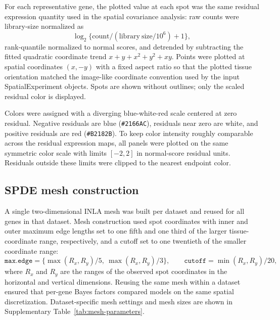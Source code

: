 For each representative gene, the plotted value at each spot was the same residual expression quantity used in the spatial covariance analysis: raw counts were library-size normalized as
\[
\log_2\{ \mathrm{count}/(\mathrm{library\ size}/10^6) + 1\},
\]
rank-quantile normalized to normal scores, and detrended by subtracting the fitted quadratic coordinate trend \(x + y + x^2 + y^2 + xy\). Points were plotted at spatial coordinates \((x,-y)\) with a fixed aspect ratio so that the plotted tissue orientation matched the image-like coordinate convention used by the input SpatialExperiment objects. Spots are shown without outlines; only the scaled residual color is displayed.

Colors were assigned with a diverging blue-white-red scale centered at zero residual. Negative residuals are blue (\texttt{\#2166AC}), residuals near zero are white, and positive residuals are red (\texttt{\#B2182B}). To keep color intensity roughly comparable across the residual expression maps, all panels were plotted on the same symmetric color scale with limits \([-2,2]\) in normal-score residual units. Residuals outside these limits were clipped to the nearest endpoint color.

\subsection{SPDE mesh construction}
A single two-dimensional INLA mesh was built per dataset and reused for all genes in that dataset. Mesh construction used spot coordinates with inner and outer maximum edge lengths set to one fifth and one third of the larger tissue-coordinate range, respectively, and a cutoff set to one twentieth of the smaller coordinate range:
\[
\texttt{max.edge} = \{\max(R_x,R_y)/5,\ \max(R_x,R_y)/3\}, \qquad
\texttt{cutoff} = \min(R_x,R_y)/20,
\]
where \(R_x\) and \(R_y\) are the ranges of the observed spot coordinates in the horizontal and vertical dimensions. Reusing the same mesh within a dataset ensured that per-gene Bayes factors compared models on the same spatial discretization. Dataset-specific mesh settings and mesh sizes are shown in Supplementary Table~\ref{tab:mesh-parameters}.


